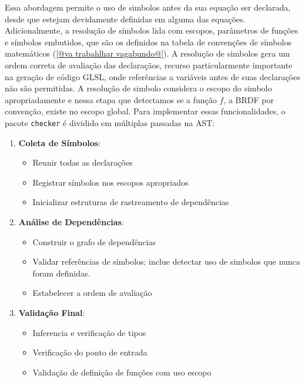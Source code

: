 Essa abordagem permite o uso de simbolos antes da sua equação ser declarada, desde que estejam devidamente definidas em alguma das equações. Adicionalmente, a resolução de símbolos lida com escopos, parâmetros de funções e símbolos embutidos, que são os definidos na tabela de convenções de símbolos matemáticos (\autoref{@va trabahlhar vagabundo@}). A resolução de simbolos gera um ordem correta de avaliação das declaraçãos, recurso particularmente importante na geração de código GLSL, onde referências a variáveis antes de suas declarações não são permitidas. A resolução de simbolo considera o escopo do simbolo apropriadamente e nessa etapa que detectamos se a função $f$, a BRDF por convenção, existe no escopo global. Para implementar essas funcionalidades, o pacote \texttt{checker} é dividido em múltiplas passadas na AST:

\begin{enumerate}
    \item \textbf{Coleta de Símbolos}:
    \begin{itemize}
        \item Reunir todas as declarações
        \item Registrar símbolos nos escopos apropriados
        \item Inicializar estruturas de rastreamento de dependências
    \end{itemize}

    \item \textbf{Análise de Dependências}:
    \begin{itemize}
        \item Construir o grafo de dependências
        \item Validar referências de símbolos; inclue detectar uso de simbolos que nunca foram definidas.
        \item Estabelecer a ordem de avaliação
    \end{itemize}

    \item \textbf{Validação Final}:
    \begin{itemize}
        \item Inferencia e verificação de tipos
        \item Verificação do ponto de entrada
        \item Validação de definição de funções com uso escopo
    \end{itemize}
\end{enumerate}



